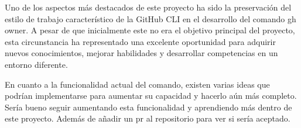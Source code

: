 Uno de los aspectos más destacados de este proyecto ha sido la preservación del estilo de trabajo característico de la GitHub CLI en el desarrollo del comando gh owner. A pesar de que inicialmente este no era el objetivo principal del proyecto, esta circunstancia ha representado una excelente oportunidad para adquirir nuevos conocimientos, mejorar habilidades y desarrollar competencias en un entorno diferente.

En cuanto a la funcionalidad actual del comando, existen varias ideas que podrían implementarse para aumentar su capacidad y hacerlo aún más completo. Sería bueno seguir aumentando esta funcionalidad y aprendiendo más dentro de este proyecto. Además de añadir un pr al repositorio para ver si sería aceptado.